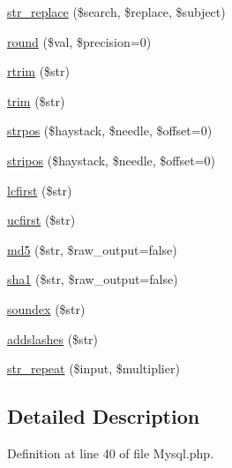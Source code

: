 \begin{DoxyCompactItemize}
\hyperlink{class_p_h_p_linq___adapter___pdo___mysql_acf873c5fe629bc33732a0a2bc304f0f8}{str\-\_\-replace} (\$search, \$replace, \$subject)
\item 
\hyperlink{class_p_h_p_linq___adapter___pdo___mysql_aa9d8fa8127391960c54ee0c5a31e18a3}{round} (\$val, \$precision=0)
\item 
\hyperlink{class_p_h_p_linq___adapter___pdo___mysql_afa81b944f8aed770a266a9884e3e5049}{rtrim} (\$str)
\item 
\hyperlink{class_p_h_p_linq___adapter___pdo___mysql_a432e7b973a6e6bfa55cced21e75ee29e}{trim} (\$str)
\item 
\hyperlink{class_p_h_p_linq___adapter___pdo___mysql_a75b50139ee3829fbfd47af6805284786}{strpos} (\$haystack, \$needle, \$offset=0)
\item 
\hyperlink{class_p_h_p_linq___adapter___pdo___mysql_aa0297b92e96759a576d3aa8caa22b10d}{stripos} (\$haystack, \$needle, \$offset=0)
\item 
\hyperlink{class_p_h_p_linq___adapter___pdo___mysql_a30bdc1fd395302cfaeabd165adde41c9}{lcfirst} (\$str)
\item 
\hyperlink{class_p_h_p_linq___adapter___pdo___mysql_a7d8809b3fca65a75b2bd2ebbea5b3695}{ucfirst} (\$str)
\item 
\hyperlink{class_p_h_p_linq___adapter___pdo___mysql_ad89ffd1039629dc781704c405abc87a7}{md5} (\$str, \$raw\-\_\-output=false)
\item 
\hyperlink{class_p_h_p_linq___adapter___pdo___mysql_aeb44f0e1038759e5c086db848661f845}{sha1} (\$str, \$raw\-\_\-output=false)
\item 
\hyperlink{class_p_h_p_linq___adapter___pdo___mysql_a5d9e5163f9c4dfcf3b36a635c8ba5638}{soundex} (\$str)
\item 
\hyperlink{class_p_h_p_linq___adapter___pdo___mysql_aec7fed6f81c650fb3106e2f0eed11e03}{addslashes} (\$str)
\item 
\hyperlink{class_p_h_p_linq___adapter___pdo___mysql_a046ec25a1370781be01e1590d84aecf7}{str\-\_\-repeat} (\$input, \$multiplier)
\end{DoxyCompactItemize}


\subsection{\-Detailed \-Description}


\-Definition at line 40 of file \-Mysql.\-php.



